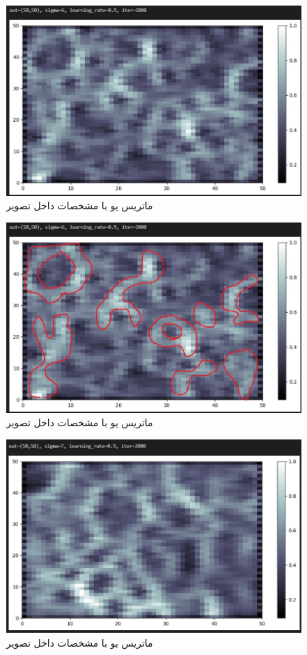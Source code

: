 \documentclass{article}
\begin{document}
\cleardoublepage


\begin{figure}[!h]
    \centering\includegraphics[scale=.65]{./p3-11}
    \caption{ماتریس یو با مشخصات داخل تصویر}\label{fig.311}
\end{figure}

\begin{figure}[!h]
    \centering\includegraphics[scale=.65]{./p3-12}
    \caption{ماتریس یو با مشخصات داخل تصویر}\label{fig.312}
\end{figure}


\cleardoublepage


\begin{figure}[!h]
    \centering\includegraphics[scale=.65]{./p3-13}
    \caption{ماتریس یو با مشخصات داخل تصویر}\label{fig.313}
\end{figure}
\end{document}
